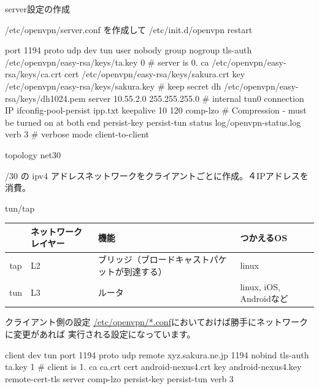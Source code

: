 \begin{frame}[containsverbatim]{server設定の作成}

/etc/openvpn/server.conf を作成して /etc/init.d/openvpn restart

\begin{commandline}
port 1194
proto udp
dev tun
user nobody
group nogroup
tls-auth      /etc/openvpn/easy-rsa/keys/ta.key 0 # server is 0.
ca      /etc/openvpn/easy-rsa/keys/ca.crt
cert    /etc/openvpn/easy-rsa/keys/sakura.crt
key     /etc/openvpn/easy-rsa/keys/sakura.key  # keep secret
dh      /etc/openvpn/easy-rsa/keys/dh1024.pem
server 10.55.2.0 255.255.255.0  # internal tun0 connection IP
ifconfig-pool-persist ipp.txt
keepalive 10 120
comp-lzo         # Compression - must be turned on at both end
persist-key
persist-tun
status log/openvpn-status.log
verb 3  # verbose mode
client-to-client
 
\end{commandline}
\end{frame}

\begin{frame}{topology net30}

/30 の ipv4 アドレスネットワークをクライアントごとに作成。４IPアドレスを
消費。

\end{frame}

\begin{frame}{tun/tap}

\begin{tabular}{|c|p{4em}|p{8em}|p{8em}|}
\hline
 & ネットワークレイヤー & 機能 & つかえるOS\\
\hline
tap & L2 & ブリッジ（ブロードキャストパケットが到達する） & linux \\
tun & L3 & ルータ & linux, iOS, Androidなど \\
\hline
\hline
\end{tabular}
\end{frame}

\begin{frame}[containsverbatim]{クライアント側の設定}
\url{/etc/openvpn/*.conf}においておけば勝手にネットワークに変更があれば
 実行される設定になっています。

\begin{commandline}
client
dev tun
port 1194
proto udp
remote xyz.sakura.ne.jp 1194
nobind
tls-auth      ta.key 1 # client is 1.
ca ca.crt
cert android-nexus4.crt
key android-nexus4.key
remote-cert-tls server
comp-lzo
persist-key
persist-tun
verb 3
\end{commandline}
\end{frame}

